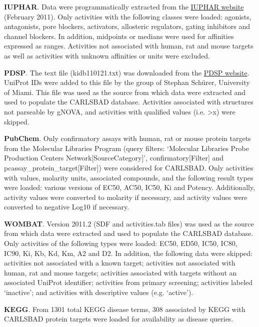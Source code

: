 \textbf{IUPHAR}. Data were programmatically extracted from the \href{http://www.iuphar-db.org/}{IUPHAR website} (February 2011). Only activities with the following classes were loaded: agonists, antagonists, pore blockers, activators, allosteric regulators, gating inhibitors and channel blockers. In addition, midpoints or medians were used for affinities expressed as ranges. Activities not associated with human, rat and mouse targets as well as activities with unknown affinities or units were excluded.

\textbf{PDSP}. The text file (kidb110121.txt) was downloaded from the \href{http://pdsp.med.unc.edu/indexR.html}{PDSP website}. UniProt IDs were added to this file by the group of Stephan Sch\"{u}rer, University of Miami. This file was used as the source from which data were extracted and used to populate the CARLSBAD database. Activities associated with structures not parseable by gNOVA, and activities with qualified values (i.e. \textgreater x) were skipped.

\textbf{PubChem}. Only confirmatory assays with human, rat or mouse protein targets from the Molecular Libraries Program (query filters: ‘Molecular Libraries Probe Production Centers Network[SourceCategory]’, confirmatory[Filter] and pcassay\_protein\_target[Filter]) were considered for CARLSBAD. Only activities with values, molarity units, associated compounds, and the following result types were loaded: various versions of EC50, AC50, IC50, Ki and Potency. Additionally, activity values were converted to molarity if necessary, and activity values were converted to negative Log10 if necessary.

\textbf{WOMBAT}. Version 2011.2 (SDF and activities.tab files) was used as the source from which data were extracted and used to populate the CARLSBAD database. Only activities of the following types were loaded: EC50, ED50, IC50, IC80, IC90, Ki, Kb, Kd, Km, A2 and D2. In addition, the following data were skipped: activities not associated with a known target; activities not associated with human, rat and mouse targets; activities associated with targets without an associated UniProt identifier; activities from primary screening; activities labeled ‘inactive’; and activities with descriptive values (e.g. ‘active’).

\textbf{KEGG}. From 1301 total KEGG disease terms, 308 associated by KEGG with CARLSBAD protein targets were loaded for availability as disease queries.

